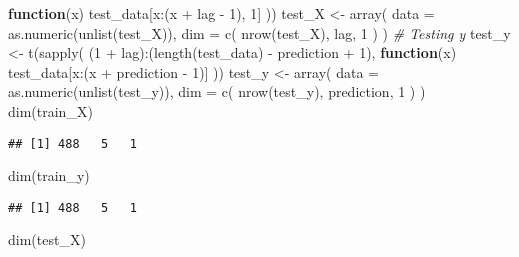 \documentclass[
]{article}
\newenvironment{Shaded}{\begin{snugshade}}{\end{snugshade}}
\newcommand{\AttributeTok}[1]{\textcolor[rgb]{0.77,0.63,0.00}{#1}}
\newcommand{\CommentTok}[1]{\textcolor[rgb]{0.56,0.35,0.01}{\textit{#1}}}
\newcommand{\ControlFlowTok}[1]{\textcolor[rgb]{0.13,0.29,0.53}{\textbf{#1}}}
\newcommand{\DecValTok}[1]{\textcolor[rgb]{0.00,0.00,0.81}{#1}}
\newcommand{\FunctionTok}[1]{\textcolor[rgb]{0.00,0.00,0.00}{#1}}
\newcommand{\NormalTok}[1]{#1}
\newcommand{\OtherTok}[1]{\textcolor[rgb]{0.56,0.35,0.01}{#1}}
\newcommand{\SpecialCharTok}[1]{\textcolor[rgb]{0.00,0.00,0.00}{#1}}
\begin{document}
\begin{Shaded}
\begin{Highlighting}[]
    \ControlFlowTok{function}\NormalTok{(x) test\_data[x}\SpecialCharTok{:}\NormalTok{(x }\SpecialCharTok{+}\NormalTok{ lag }\SpecialCharTok{{-}} \DecValTok{1}\NormalTok{), }\DecValTok{1}\NormalTok{]}
\NormalTok{  ))}
\NormalTok{test\_X }\OtherTok{\textless{}{-}} \FunctionTok{array}\NormalTok{(}
    \AttributeTok{data =} \FunctionTok{as.numeric}\NormalTok{(}\FunctionTok{unlist}\NormalTok{(test\_X)),}
    \AttributeTok{dim =} \FunctionTok{c}\NormalTok{(}
        \FunctionTok{nrow}\NormalTok{(test\_X),}
\NormalTok{        lag,}
        \DecValTok{1}
\NormalTok{    )}
\NormalTok{)}
\CommentTok{\# Testing y}
\NormalTok{test\_y }\OtherTok{\textless{}{-}} \FunctionTok{t}\NormalTok{(}\FunctionTok{sapply}\NormalTok{(}
\NormalTok{    (}\DecValTok{1} \SpecialCharTok{+}\NormalTok{ lag)}\SpecialCharTok{:}\NormalTok{(}\FunctionTok{length}\NormalTok{(test\_data) }\SpecialCharTok{{-}}\NormalTok{ prediction }\SpecialCharTok{+} \DecValTok{1}\NormalTok{),}
    \ControlFlowTok{function}\NormalTok{(x) test\_data[x}\SpecialCharTok{:}\NormalTok{(x }\SpecialCharTok{+}\NormalTok{ prediction }\SpecialCharTok{{-}} \DecValTok{1}\NormalTok{)]}
\NormalTok{))}
\NormalTok{test\_y }\OtherTok{\textless{}{-}} \FunctionTok{array}\NormalTok{(}
    \AttributeTok{data =} \FunctionTok{as.numeric}\NormalTok{(}\FunctionTok{unlist}\NormalTok{(test\_y)),}
    \AttributeTok{dim =} \FunctionTok{c}\NormalTok{(}
        \FunctionTok{nrow}\NormalTok{(test\_y),}
\NormalTok{        prediction,}
        \DecValTok{1}
\NormalTok{    )}
\NormalTok{)}
\FunctionTok{dim}\NormalTok{(train\_X)}
\end{Highlighting}
\end{Shaded}

\begin{verbatim}
## [1] 488   5   1
\end{verbatim}

\begin{Shaded}
\begin{Highlighting}[]
\FunctionTok{dim}\NormalTok{(train\_y)}
\end{Highlighting}
\end{Shaded}

\begin{verbatim}
## [1] 488   5   1
\end{verbatim}

\begin{Shaded}
\begin{Highlighting}[]
\FunctionTok{dim}\NormalTok{(test\_X)}
\end{Highlighting}
\end{Shaded}
\end{document}
